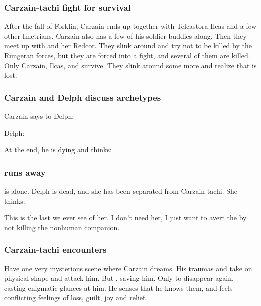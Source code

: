 \subsubsection{Carzain-tachi fight for survival}
After the fall of Forklin, Carzain ends up together with Telcastora Ilcas and a few other Imetrians. 
Carzain also has a few of his soldier buddies along. 
Then they meet up with \Esmerel{} and her Redcor. 
They slink around and try not to be killed by the Rungeran forces, but they are forced into a fight, and several of them are killed. 
Only Carzain, Ilcas, \Esmerel{} and \Racel{} survive. 
They slink around some more and realize that \Forclin{} is lost. 





\subsubsection{Carzain and Delph discuss archetypes}
Carzain says to Delph: 

Delph:

At the end, he is dying and thinks: 





\subsubsection{\Tsekkect{} runs away}
\Tsekkect{} is alone. 
Delph is dead, and she has been separated from Carzain-tachi. 
She thinks:

This is the last we ever see of her. 
I don't need her, I just want to avert the  by not killing the nonhuman companion. 





\subsubsection{Carzain-tachi encounters \vorcanths}
Have one very mysterious scene where Carzain dreams. 
His traumas and  take on physical shape and attack him. 
But , saving him. 
Only to disappear again, casting enigmatic glances at him. 
He senses that he knows them, and feels conflicting feelings of loss, guilt, joy and relief.

